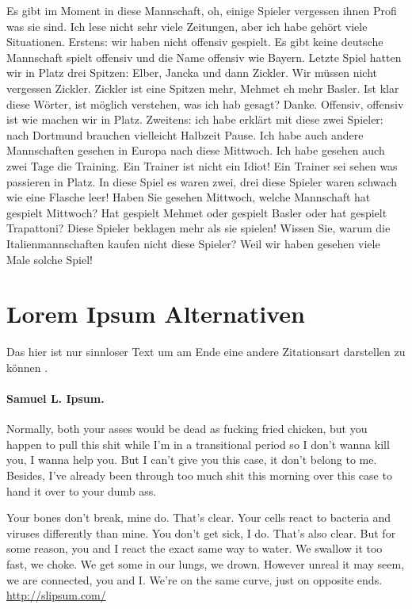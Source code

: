 \documentclass[12pt,        %
  english,ngerman,          %
  paper=a4,                 %
  captions=tablesignature,  %
  listof=numbered,          %
  bibliography=totoc,       %
  headings=small,           %
  headinclude=false,        %
  footinclude=false,        %
  parskip=half-,            %
  oneside,                  %
  DIV=12                    %
]{styles/coliartcl}
\begin{document}
Es gibt im Moment in diese Mannschaft, oh, einige Spieler vergessen ihnen Profi was sie sind. Ich lese nicht sehr viele Zeitungen, aber ich habe gehört viele Situationen. Erstens: wir haben nicht offensiv gespielt. Es gibt keine deutsche Mannschaft spielt offensiv und die Name offensiv wie Bayern. Letzte Spiel hatten wir in Platz drei Spitzen: Elber, Jancka und dann Zickler. Wir müssen nicht vergessen Zickler. Zickler ist eine Spitzen mehr, Mehmet eh mehr Basler. Ist klar diese Wörter, ist möglich verstehen, was ich hab gesagt? Danke. Offensiv, offensiv ist wie machen wir in Platz. Zweitens: ich habe erklärt mit diese zwei Spieler: nach Dortmund brauchen vielleicht Halbzeit Pause. Ich habe auch andere Mannschaften gesehen in Europa nach diese Mittwoch. Ich habe gesehen auch zwei Tage die Training. Ein Trainer ist nicht ein Idiot! Ein Trainer sei sehen was passieren in Platz. In diese Spiel es waren zwei, drei diese Spieler waren schwach wie eine Flasche leer! Haben Sie gesehen Mittwoch, welche Mannschaft hat gespielt Mittwoch? Hat gespielt Mehmet oder gespielt Basler oder hat gespielt Trapattoni? Diese Spieler beklagen mehr als sie spielen! Wissen Sie, warum die Italienmannschaften kaufen nicht diese Spieler? Weil wir haben gesehen viele Male solche Spiel! \cite{Bottou2014}


\section*{Lorem Ipsum Alternativen}

Das hier ist nur sinnloser Text um am Ende eine andere Zitationsart darstellen zu können \citealp{Wartena2015}.

\paragraph*{Samuel L. Ipsum.}  Normally, both your asses would be dead as fucking fried chicken, but you happen to pull this shit while I'm in a transitional period so I don't wanna kill you, I wanna help you. But I can't give you this case, it don't belong to me. Besides, I've already been through too much shit this morning over this case to hand it over to your dumb ass.

Your bones don't break, mine do. That's clear. Your cells react to bacteria and viruses differently than mine. You don't get sick, I do. That's also clear. But for some reason, you and I react the exact same way to water. We swallow it too fast, we choke. We get some in our lungs, we drown. However unreal it may seem, we are connected, you and I. We're on the same curve, just on opposite ends.
\url{http://slipsum.com/}
\end{document}
